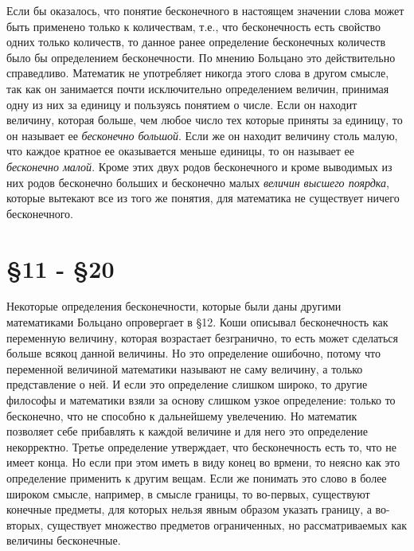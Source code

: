 \documentclass[12pt]{extarticle}
\begin{document}
Если бы оказалось, что понятие бесконечного в настоящем значении слова может быть применено только к количествам, т.е., что бесконечность есть
свойство одних только количеств, то данное ранее определение бесконечных количеств было бы определением бесконечности. По мнению Больцано это действительно справедливо. Математик не употребляет никогда этого слова в другом смысле, так как он занимается почти исключительно определением величин, принимая одну из них за единицу и пользуясь понятием о
числе. Если он находит величину, которая больше, чем любое число тех
которые приняты за единицу, то он называет ее \textit{бесконечно большой}. Если же он находит величину столь малую, что каждое
кратное ее оказывается меньше единицы, то он называет ее
\textit{бесконечно малой}. Кроме этих двух родов бесконечного и
кроме выводимых из них родов бесконечно больших и бесконечно малых
\textit{величин высшего поярдка}, которые вытекают все из того
же понятия, для математика не существует ничего бесконечного.

\section{\S 11 - \S 20}
Некоторые определения бесконечности, которые были даны другими математиками Больцано опровергает в \S 12. 
Коши описывал бесконечность как переменную величину, которая возрастает безгранично, то есть может сделаться больше всякоц данной величины. Но это определение ошибочно, потому что переменной величиной математики называют не саму величину, а только представление о ней. 
И если это определение слишком широко, то другие философы и математики взяли за основу слишком узкое определение: только то бесконечно, что не способно к дальнейшему увелечению. Но математик позволяет себе прибавлять к каждой величине и для него это определение некорректно. 
Третье определение утверждает, что бесконечность есть то, что не имеет конца. Но если при этом иметь в виду конец во врмени, то неясно как это определение применить к другим вещам. Если же понимать это слово в более широком смысле, например, в смысле границы, то во-первых, существуют конечные предметы, для которых нельзя явным образом указать границу, а во-вторых, существует множество предметов ограниченных, но рассматриваемых как величины бесконечные. 
\end{document}
